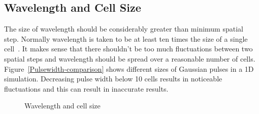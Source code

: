 \subsection{Wavelength and Cell Size}
The size of wavelength should be considerably greater than minimum spatial step. Normally wavelength is taken to be at least ten times the size of a single cell~\cite{Taflove2000}. It makes sense that there shouldn't be too much fluctuations between two spatial steps and wavelength should be spread over a reasonable number of cells. Figure~\ref{Pulsewidth-comparison} shows different sizes of Gaussian pulses in a 1D simulation. Decreasing pulse width below 10 cells results in noticeable fluctuations and this can result in inaccurate results.
\begin{figure}[H]
\centering
{}
\caption{Wavelength and cell size}
\label{Wavelength-Vs-Cell-Size}
\end{figure}
